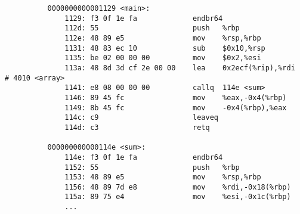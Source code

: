\begin{example}
\begin{lstlisting}
          0000000000001129 <main>:
              1129:	f3 0f 1e fa          	endbr64 
              112d:	55                   	push   %rbp
              112e:	48 89 e5             	mov    %rsp,%rbp
              1131:	48 83 ec 10          	sub    $0x10,%rsp
              1135:	be 02 00 00 00       	mov    $0x2,%esi
              113a:	48 8d 3d cf 2e 00 00 	lea    0x2ecf(%rip),%rdi        # 4010 <array>
              1141:	e8 08 00 00 00       	callq  114e <sum>
              1146:	89 45 fc             	mov    %eax,-0x4(%rbp)
              1149:	8b 45 fc             	mov    -0x4(%rbp),%eax
              114c:	c9                   	leaveq 
              114d:	c3                   	retq   

          000000000000114e <sum>:
              114e:	f3 0f 1e fa          	endbr64 
              1152:	55                   	push   %rbp
              1153:	48 89 e5             	mov    %rsp,%rbp
              1156:	48 89 7d e8          	mov    %rdi,-0x18(%rbp)
              115a:	89 75 e4             	mov    %esi,-0x1c(%rbp) 
              ...
        \end{lstlisting}
      \end{example}

